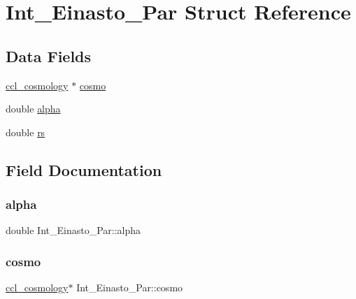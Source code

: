 \hypertarget{struct_int___einasto___par}{}\section{Int\+\_\+\+Einasto\+\_\+\+Par Struct Reference}
\label{struct_int___einasto___par}
\subsection*{Data Fields}
\begin{DoxyCompactItemize}
\item 
\mbox{\hyperlink{structccl__cosmology}{ccl\+\_\+cosmology}} $\ast$ \mbox{\hyperlink{struct_int___einasto___par_ab6f6a92ac42f5bbe832d37dda237774b}{cosmo}}
\item 
double \mbox{\hyperlink{struct_int___einasto___par_af436b8fd81f4ea774f13058d0dc28d5a}{alpha}}
\item 
double \mbox{\hyperlink{struct_int___einasto___par_ae65e5b7551a2fd6aaae65d2bf268250d}{rs}}
\end{DoxyCompactItemize}


\subsection{Field Documentation}
\mbox{\label{struct_int___einasto___par_af436b8fd81f4ea774f13058d0dc28d5a}} 
\subsubsection{\texorpdfstring{alpha}{alpha}}
{\footnotesize\ttfamily double Int\+\_\+\+Einasto\+\_\+\+Par\+::alpha}

\mbox{\label{struct_int___einasto___par_ab6f6a92ac42f5bbe832d37dda237774b}} 
\subsubsection{\texorpdfstring{cosmo}{cosmo}}
{\footnotesize\ttfamily \mbox{\hyperlink{structccl__cosmology}{ccl\+\_\+cosmology}}$\ast$ Int\+\_\+\+Einasto\+\_\+\+Par\+::cosmo}

